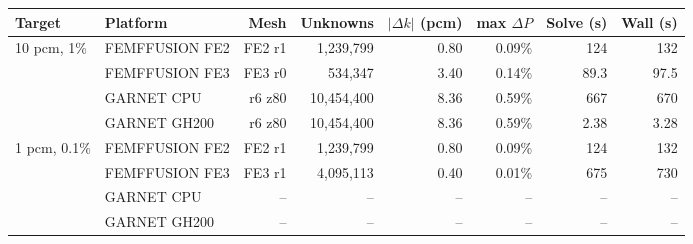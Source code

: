\begin{tabular}{llrrrrrr}
\hline
Target & Platform & Mesh & Unknowns & $|\Delta k|$ (pcm) & max $\Delta P$ & Solve (s) & Wall (s) \\
\hline
10 pcm, 1\% & FEMFFUSION FE2 & FE2 r1 & 1,239,799 & 0.80 & 0.09\% & 124 & 132 \\
 & FEMFFUSION FE3 & FE3 r0 & 534,347 & 3.40 & 0.14\% & 89.3 & 97.5 \\
 & GARNET CPU & r6 z80 & 10,454,400 & 8.36 & 0.59\% & 667 & 670 \\
 & GARNET GH200 & r6 z80 & 10,454,400 & 8.36 & 0.59\% & 2.38 & 3.28 \\
\hline
1 pcm, 0.1\% & FEMFFUSION FE2 & FE2 r1 & 1,239,799 & 0.80 & 0.09\% & 124 & 132 \\
 & FEMFFUSION FE3 & FE3 r1 & 4,095,113 & 0.40 & 0.01\% & 675 & 730 \\
 & GARNET CPU & -- & -- & -- & -- & -- & -- \\
 & GARNET GH200 & -- & -- & -- & -- & -- & -- \\
\hline
\end{tabular}
